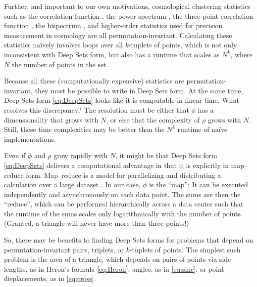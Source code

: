\documentclass[10pt]{article}
\begin{document}
Further, and important to our own motivations, cosmological clustering statistics such as 
the correlation function \citep{Peebles1973},
the power spectrum \citep{Peebles1973},
the three-point correlation function \citep{PeeblesGroth1975},
the bispectrum \citep{FrySeldner1982},
and higher-order statistics \citep{Peebles1980book}
used for precision measurement in cosmology \citep[e.g.,][]{Eisenstein+2005BAO,Planck18PNG,Planck18Inflation,Cabass+2022}
are all permutation-invariant.
Calculating these statistics na\"ively involves loops over all $k$-tuplets of points, which is not only inconsistent with Deep Sets form, but also has a runtime that scales as $N^k$, where $N$ the number of points in the set.

Because all these (computationally expensive) statistics are permutation-invariant, they must be possible to write in Deep Sets form.
At the same time, Deep Sets form \eqref{eq:DeepSets} looks like it is computable in linear time.
What resolves this discrepancy?
The resolution must be either that $\phi$ has a dimensionality that grows with $N$, or else that the complexity of $\rho$ grows with $N$.
Still, these time complexities may be better than the $N^k$ runtime of na\"ive implementations.

Even if $\phi$ and $\rho$ grow rapidly with $N$, it might be that Deep Sets form \eqref{eq:DeepSets} delivers a computational advantage in that it is explicitly in map--reduce form.
Map--reduce is a model for parallelizing and distributing a calculation over a large dataset \citep{DeanGhemawat2008,Lammel2008}.
In our case, $\phi$ is the ``map'':
It can be executed independently and asynchronously on each data point.
The sums are then the ``reduce'', which can be performed hierarchically across a data center such that the runtime of the sums scales only logarithmically with the number of points.
(Granted, a triangle will never have more than three points!)

So, there may be benefits to finding Deep Sets forms for problems that depend on permutation-invariant pairs, triplets, or $k$-tuplets of points.
The simplest such problem is the area of a triangle, which depends on pairs of points via
side lengths, as in Heron's formula \eqref{eq:Heron};
angles, as in \eqref{eq:sine};
or point displacements, as in \eqref{eq:cross}.
\end{document}
